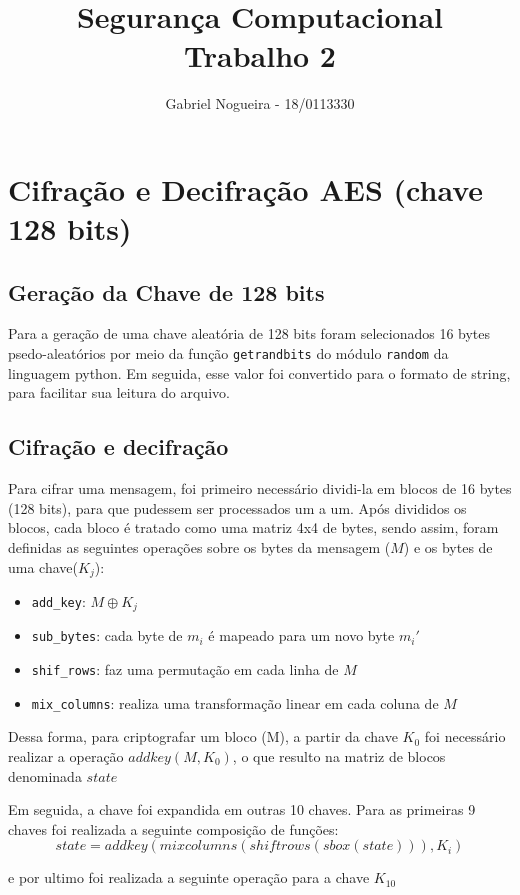 \documentclass[11pt]{article}
\author{Gabriel Nogueira - 18/0113330}
\date{}
\title{Segurança Computacional\\\medskip
\large Trabalho 2}
\begin{document}
\maketitle

\section{Cifração e Decifração AES (chave 128 bits)}
\label{sec:orga6a814a}
\subsection{Geração da Chave de 128 bits}
\label{sec:org46e0b4d}
Para a geração de uma chave aleatória de 128 bits foram selecionados 16 bytes psedo-aleatórios por meio da função \texttt{getrandbits} do módulo \texttt{random} da linguagem python. Em seguida, esse valor foi convertido para o formato de string, para facilitar sua leitura do arquivo.
\subsection{Cifração e decifração}
\label{sec:orgbfea89a}
Para cifrar uma mensagem, foi primeiro necessário dividi-la em blocos de 16 bytes (128 bits), para que pudessem ser processados um a um.
Após divididos os blocos, cada bloco é tratado como uma matriz 4x4 de bytes, sendo assim, foram definidas as seguintes operações sobre os bytes da mensagem (\(M\)) e os bytes de uma chave(\(K_j\)):
\begin{itemize}
\item \texttt{add\_key}: \(M \oplus K_j\)
\item \texttt{sub\_bytes}: cada byte de \(m_i\) é mapeado para um novo byte \(m_i'\)
\item \texttt{shif\_rows}: faz uma permutação em cada linha de \(M\)
\item \texttt{mix\_columns}: realiza uma transformação linear em cada coluna de \(M\)
\end{itemize}

Dessa forma, para criptografar um bloco (M), a partir da chave \(K_0\) foi necessário realizar a operação \(addkey(M, K_0)\), o que resulto na matriz de blocos denominada \(state\)

Em seguida, a chave foi expandida em outras 10 chaves. Para as primeiras 9 chaves foi realizada a seguinte composição de funções:
$$
state = addkey(mixcolumns(shiftrows(sbox(state))), K_i)
$$

e por ultimo foi realizada a seguinte operação para a chave \(K_{10}\)
\end{document}
